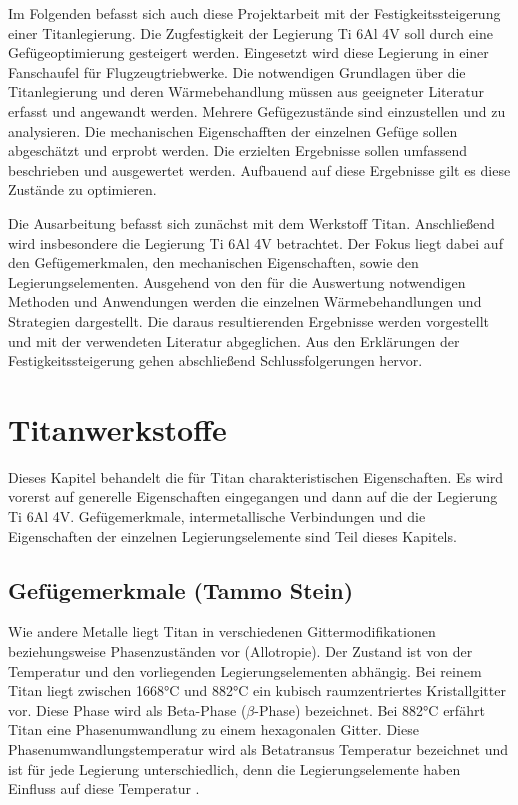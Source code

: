 \documentclass[a4paper, 11pt]{tubsreprt}
\begin{document}
Im Folgenden befasst sich auch diese Projektarbeit mit der Festigkeitssteigerung einer Titanlegierung. Die Zugfestigkeit der Legierung Ti 6Al 4V soll durch eine Gefügeoptimierung gesteigert werden. Eingesetzt wird diese Legierung in einer Fanschaufel für Flugzeugtriebwerke. Die notwendigen Grundlagen über die Titanlegierung und deren Wärmebehandlung müssen aus geeigneter Literatur erfasst und angewandt werden. Mehrere Gefügezustände sind einzustellen und zu analysieren. Die mechanischen Eigenschafften der einzelnen Gefüge sollen abgeschätzt und erprobt werden. Die erzielten Ergebnisse sollen umfassend beschrieben und ausgewertet werden. Aufbauend auf diese Ergebnisse gilt es diese Zustände zu optimieren.  
 
Die Ausarbeitung befasst sich zunächst mit dem Werkstoff Titan. Anschließend wird insbesondere die Legierung Ti 6Al 4V betrachtet. Der Fokus liegt dabei auf den Gefügemerkmalen, den mechanischen Eigenschaften, sowie den Legierungselementen. Ausgehend von den für die Auswertung notwendigen Methoden und Anwendungen werden die einzelnen Wärmebehandlungen und Strategien dargestellt. Die daraus resultierenden Ergebnisse werden vorgestellt und mit der verwendeten Literatur abgeglichen. Aus den Erklärungen der Festigkeitssteigerung gehen abschließend Schlussfolgerungen hervor.
\newpage
\ \\
\newpage
\chapter{Titanwerkstoffe}\label{Kapitel Titanwerkstoffe}
Dieses Kapitel behandelt die für Titan charakteristischen Eigenschaften. Es wird vorerst auf generelle Eigenschaften eingegangen und dann auf die der Legierung Ti 6Al 4V. Gefügemerkmale, intermetallische Verbindungen und die Eigenschaften der einzelnen Legierungselemente sind Teil dieses Kapitels.
\section{Gefügemerkmale (Tammo Stein)}\label{Abschnitt Gefügemerkmale}
Wie andere Metalle liegt Titan in verschiedenen Gittermodifikationen beziehungsweise Phasenzuständen vor (Allotropie). Der Zustand ist von der Temperatur und den vorliegenden Legierungselementen abhängig. Bei reinem Titan liegt zwischen 1668°C und 882°C ein kubisch raumzentriertes Kristallgitter vor. Diese Phase wird als Beta-Phase ($\beta$-Phase) bezeichnet. Bei 882°C erfährt Titan eine Phasenumwandlung zu einem hexagonalen Gitter. Diese Phasenumwandlungstemperatur wird als Betatransus Temperatur bezeichnet und ist für jede Legierung unterschiedlich, denn die Legierungselemente haben Einfluss auf diese Temperatur \cite{Luetjering2007}.
\end{document}
